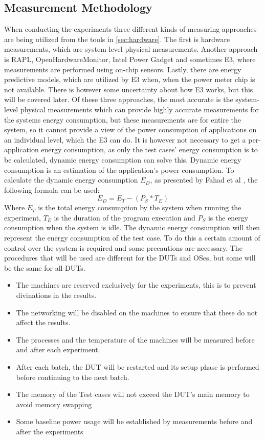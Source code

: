 \subsection{Measurement Methodology}
When conducting the experiments three different kinds of measuring approaches are being utilized from the tools in \cref{sec:hardware}.
The first is hardware measurements, which are system-level physical measurements. Another approach is RAPL, OpenHardwareMonitor, Intel Power Gadget and sometimes E3, where measurements are performed using on-chip sensors. Lastly, there are energy predictive models, which are utilized by E3 when, when the power meter chip is not available. There is however some uncertainty about how E3 works, but this will be covered later. Of these three approaches, the most accurate is the system-level physical measurements which can provide highly accurate measurements for the systems energy consumption, but these measurements are for entire the system, so it cannot provide a view of the power consumption of applications on an individual level, which the E3 can do. It is however not necessary to get a per-application energy consumption, as only the test cases' energy consumption is to be calculated, dynamic energy consumption can solve this. Dynamic energy consumption is an estimation of the application's power consumption. To calculate the dynamic energy consumption $E_D$, as presented by Fahad et al \cite{fahad2019comparative}, the following formula can be used:
$$E_D = E_T -(P_S * T_E)$$
Where $E_T$ is the total energy consumption by the system when running the experiment, $T_E$ is the duration of the program execution and $P_S$ is the energy consumption when the system is idle. The dynamic energy consumption will then represent the energy consumption of the test case. To do this a certain amount of control over the system is required and some precautions are necessary. The procedures that will be used are different for the DUTs and OSes, but some will be the same for all DUTs.

\begin{itemize}
    \item The machines are reserved exclusively for the experiments, this is to prevent divinations in the results.
    \item The networking will be disabled on the machines to ensure that these do not affect the results.
    \item The processes and the temperature of the machines will be measured before and after each experiment.
    \item After each batch, the DUT will be restarted and its setup phase is performed before continuing to the next batch.
    \item The memory of the Test cases will not exceed the DUT's main memory to avoid memory swapping
    \item Some baseline power usage will be established by measurements before and after the experiments
\end{itemize}

